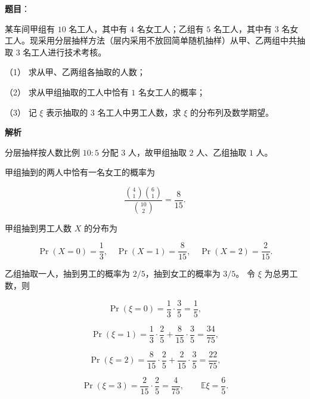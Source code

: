 \begin{answer}

\textbf{题目}：

某车间甲组有 $10$ 名工人，其中有 $4$ 名女工人；乙组有 $5$ 名工人，其中有 $3$ 名女工人。现采用分层抽样方法（层内采用不放回简单随机抽样）从甲、乙两组中共抽取 $3$ 名工人进行技术考核。

（1） 求从甲、乙两组各抽取的人数；

（2） 求从甲组抽取的工人中恰有 $1$ 名女工人的概率；

（3） 记 $\xi$ 表示抽取的 $3$ 名工人中男工人数，求 $\xi$ 的分布列及数学期望。

\textbf{解析}


分层抽样按人数比例 $10:5$ 分配 $3$ 人，故甲组抽取 $2$ 人、乙组抽取
$1$ 人。


甲组抽到的两人中恰有一名女工的概率为

\nopagebreak[4]
\[
\frac{\binom41\binom61}{\binom{10}{2}}=\frac8{15}.
\]


甲组抽到男工人数 $X$ 的分布为

\nopagebreak[4]
\[
\Pr(X=0)=\frac13,\quad
\Pr(X=1)=\frac8{15},\quad
\Pr(X=2)=\frac2{15}.
\]

乙组抽取一人，抽到男工的概率为 $2/5$，抽到女工的概率为 $3/5$。
令 $\xi$ 为总男工数，则

\nopagebreak[4]
\[
\Pr(\xi=0)=\frac13\cdot\frac35=\frac15,
\]

\nopagebreak[4]
\[
\Pr(\xi=1)=\frac13\cdot\frac25+\frac8{15}\cdot\frac35
=\frac{34}{75},
\]

\nopagebreak[4]
\[
\Pr(\xi=2)=\frac8{15}\cdot\frac25+\frac2{15}\cdot\frac35
=\frac{22}{75},
\]

\nopagebreak[4]
\[
\Pr(\xi=3)=\frac2{15}\cdot\frac25=\frac4{75},
\qquad
\mathbb E\xi=\frac65.
\]




\end{answer}

